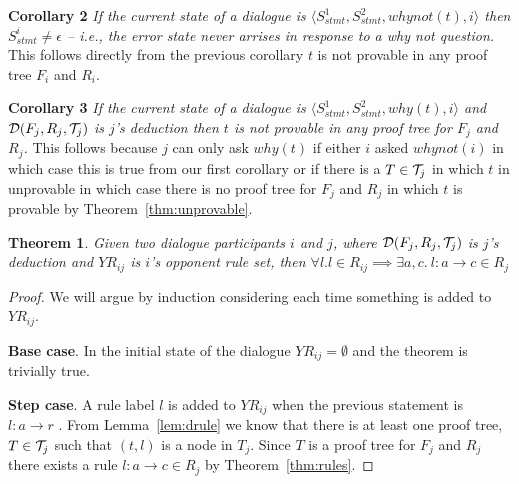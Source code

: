\documentclass{blue-book}
\newtheorem{theorem}{Theorem}
\newcommand{\drule}[3]{\ensuremath{#1:#2 \rightarrow #3}}
\newcommand{\node}[2]{\ensuremath{(#1, #2)}}
\newcommand{\deduction}[3]{\ensuremath{{\cal D}(#1, #2, #3)}}
\begin{document}
{\bf Corollary 2} \emph{If the current state of a dialogue is $\langle S^1_{stmt}, S^2_{stmt}, whynot(t), i\rangle$ then $S^i_{stmt} \neq \epsilon$ -- i.e., the error state never arrises in response to a why not question.} This follows directly from the previous corollary $t$ is not provable in any proof tree $F_i$ and $R_i$.

{\bf Corollary 3} \emph{If the current state of a dialogue is $\langle S^1_{stmt}, S^2_{stmt}, why(t), i\rangle$ and $\deduction{F_j}{R_j}{{\cal T}_j}$ is $j$'s deduction then $t$ is not provable in any proof tree for $F_j$ and $R_j$.}  This follows because $j$ can only ask $why(t)$ if either $i$ asked $whynot(i)$ in which case this is true from our first corollary or if there is a $T \in {\cal T}_j$ in which $t$ in unprovable in which case  there is no proof tree for $F_j$ and $R_j$ in which $t$ is provable by Theorem~\ref{thm:unprovable}.

\begin{theorem}
Given two dialogue participants $i$ and $j$, where $\deduction{F_j}{R_j}{{\cal T}_j}$ is $j$'s deduction and $YR_{ij}$ is $i$'s opponent rule set, then $\forall l. l \in R_{ij} \implies \exists a, c. \: \drule{l}{a}{c} \in R_j$ \end{theorem}
\begin{proof}
We will argue by induction considering each time something is added to $YR_{ij}$.

{\bf Base case}.  In the initial state of the dialogue $YR_{ij} = \emptyset$ and the theorem is trivially true.


{\bf Step case}.  A rule label $l$ is added to $YR_{ij}$ when the previous statement is $\drule{l}{a}{r}$ .  From Lemma~\ref{lem:drule} we know that there is at least one proof tree, $T \in {\cal T}_j$ such that $\node{t}{l}$ is a node in $T_j$.  Since $T$ is a proof tree for $F_j$ and $R_j$ there exists a rule  $\drule{l}{a}{c} \in R_j$ by Theorem~\ref{thm:rules}.
\end{proof}
\end{document}

